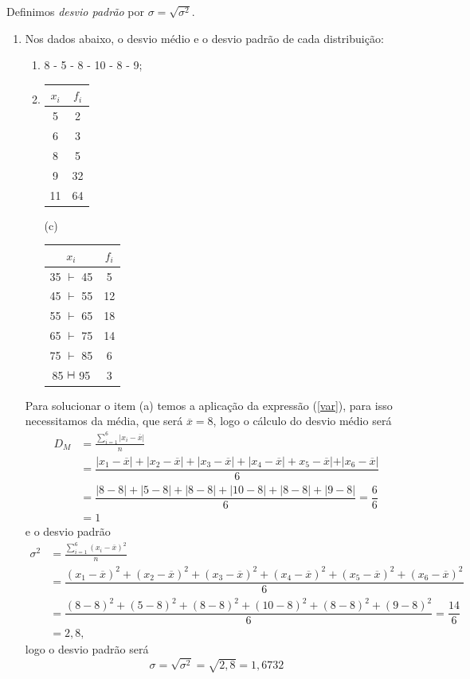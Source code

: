  \begin{defin}
    Definimos \textit{desvio padrão} por $\sigma = \sqrt{\sigma^2}$.
 \end{defin}
 
 \noindent \exemplo
 \begin{enumerate}
	\item[(i)] Nos dados abaixo, o desvio médio e o desvio padrão  de cada distribuição:
	\begin{enumerate}
		\item[(a)] 8 - 5 - 8 - 10 - 8 - 9;
		\item[(b)] \begin{tabular}{cc}
			\hline
			$x_i$ & $f_i$\\
			\hline
			5 & 2 \\
			6 & 3 \\
			8 & 5 \\
			9 & 32 \\
			11 & 64 \\
			\hline
		\end{tabular}
		\qquad \qquad \qquad (c) \begin{tabular}{cc}
			\hline
			$x_i$ & $f_i$\\
			\hline
			35 $\vdash$ 45 & 5\\
			45 $\vdash$ 55 & 12\\
			55 $\vdash$ 65 & 18\\
			65 $\vdash$ 75 & 14\\
			75 $\vdash$ 85 & 6\\
			85 $\vdash \hspace{-0.2 cm }\dashv$ 95 & 3\\
			\hline
		\end{tabular}
	\end{enumerate}
	Para solucionar o item (a) temos a aplicação da expressão (\ref{var}), para isso necessitamos da média, que será $\overline{x}=8$, logo o cálculo do desvio médio será
	\begin{align*}
	    D_M &= \frac{\displaystyle \sum_{i=1}^{6} |x_i-\overline{x}|}{n}\\
	     &= \dfrac{|x_1-\overline{x}| + |x_2-\overline{x}| + |x_3-\overline{x}| + |x_4-\overline{x}| + x_5-\overline{x}| + |x_6-\overline{x}|}{6}\\
	     &= \dfrac{|8-8| + |5-8| + |8-8| + |10-8| + |8-8| + |9-8|}{6}=\dfrac{6}{6}\\ 
	    &= 1
	\end{align*}
	e o desvio padrão
	\begin{align*}
	    \sigma^2 &= \frac{\displaystyle \sum_{i=1}^{6} (x_i-\overline{x})^2}{n}\\
	     &= \dfrac{(x_1-\overline{x})^2 + (x_2-\overline{x})^2 + (x_3-\overline{x})^2 + (x_4-\overline{x})^2 + (x_5-\overline{x})^2 + (x_6-\overline{x})^2}{6}\\
	     &= \dfrac{(8-8)^2 + (5-8)^2 + (8-8)^2 + (10-8)^2 + (8-8)^2 + (9-8)^2}{6}=\dfrac{14}{6}\\ 
	    &= 2,8,
	\end{align*}
	logo o desvio padrão será 
	\begin{equation*}
	    \sigma = \sqrt{\sigma^2} = \sqrt{2,8} = 1,6732
	\end{equation*}
\end{enumerate}
